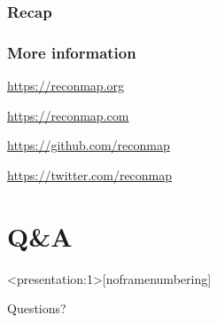 \documentclass{beamer}
\begin{document}






\begin{frame}
    \frametitle{Recap}

    \note[item]{
    }

    \tableofcontents
\end{frame}

\begin{frame}
    \frametitle{More information}

    \note[item]{
    }

	\begin{description}[style=nextline]
	   \item[Documentation] \url{https://reconmap.org}
	   \item[SaaS] \url{https://reconmap.com}
	   \item[Code] \url{https://github.com/reconmap}
	   \item[Twitter] \url{https://twitter.com/reconmap}	   
	\end{description}
\end{frame}

\section{Q\&A}
\begin{frame}<presentation:1>[noframenumbering]
	\begin{Huge}
	Questions?
	\end{Huge}
\end{frame}
\end{document}
